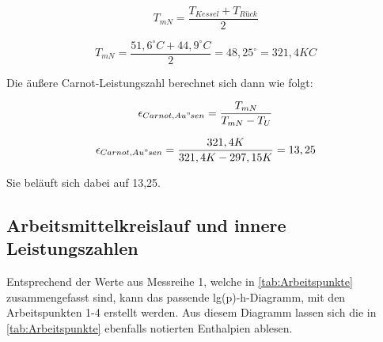 \begin{equation}
    T_{mN}=\frac{T_{Kessel}+T_{Rück}}{2}
\end{equation}

$$T_{mN}=\frac{51,6^{\circ}C+44,9^{\circ}C}{2}=48,25^{\circ}= 321,4 KC$$

Die äußere Carnot-Leistungszahl berechnet sich dann wie folgt: 

\begin{equation}
\epsilon_{Carnot, Au"sen} = \frac{T_{mN}}{T_{mN}-T_{U}}
\label{eq:110623_aeußere Carnot Leistungszahl}
\end{equation}

$$\epsilon_{Carnot, Au"sen} = \frac{321,4 K}{321,4 K-297,15K} = 13,25$$

Sie beläuft sich dabei auf 13,25.

\subsection{Arbeitsmittelkreislauf und innere Leistungszahlen}
Entsprechend der Werte aus Messreihe 1, welche in \autoref{tab:Arbeitspunkte} zusammengefasst sind, kann das passende
lg(p)-h-Diagramm, mit den Arbeitspunkten 1-4 erstellt werden. Aus diesem Diagramm lassen sich die in \autoref{tab:Arbeitspunkte} ebenfalls
notierten Enthalpien ablesen.

\begin{table}[!h]
    \centering
    \caption{Arbeitspunkte entsprechend Messreihe 1}
    \label{tab:Arbeitspunkte}
    \end{table}

